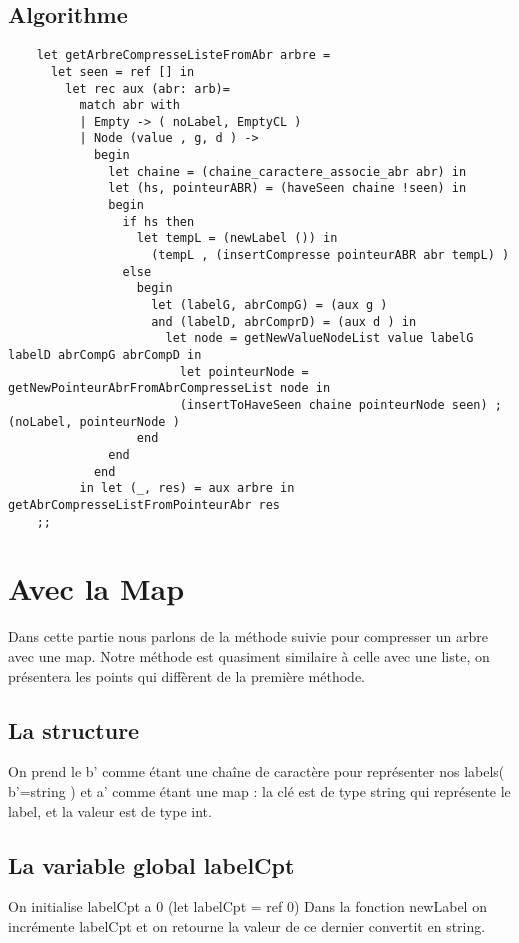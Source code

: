     \subsection{Algorithme}
    \begin{verbatim} 
    let getArbreCompresseListeFromAbr arbre = 
      let seen = ref [] in 
        let rec aux (abr: arb)= 
          match abr with 
          | Empty -> ( noLabel, EmptyCL )
          | Node (value , g, d ) -> 
            begin 
              let chaine = (chaine_caractere_associe_abr abr) in 
              let (hs, pointeurABR) = (haveSeen chaine !seen) in 
              begin 
                if hs then 
                  let tempL = (newLabel ()) in 
                    (tempL , (insertCompresse pointeurABR abr tempL) ) 
                else 
                  begin
                    let (labelG, abrCompG) = (aux g )  
                    and (labelD, abrComprD) = (aux d ) in
                      let node = getNewValueNodeList value labelG labelD abrCompG abrCompD in
                        let pointeurNode = getNewPointeurAbrFromAbrCompresseList node in 
                        (insertToHaveSeen chaine pointeurNode seen) ; (noLabel, pointeurNode )
                  end
              end
            end
          in let (_, res) = aux arbre in getAbrCompresseListFromPointeurAbr res
    ;;    
    \end{verbatim}
        
    
\section{Avec la Map}
Dans cette partie nous parlons de la méthode suivie pour compresser un arbre avec une map. 
Notre méthode est quasiment similaire à celle avec une liste, on présentera les points qui 
diffèrent de la première méthode.

\subsection{La structure}
On prend le b' comme étant une chaîne de caractère  pour représenter nos labels( b'=string ) et a' comme étant une map : la clé est de type string qui représente le label, et la valeur est de type int.\\

\subsection{La variable global labelCpt}
On initialise labelCpt a 0 (let labelCpt = ref 0)
Dans la fonction newLabel on incrémente labelCpt et on retourne la valeur de ce dernier convertit en string.





